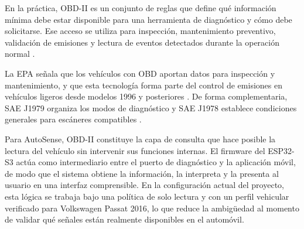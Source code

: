\documentclass[12pt,letterpaper]{report}
\begin{document}
En la práctica, OBD-II es un conjunto de reglas que define qué información mínima debe estar disponible para una herramienta de diagnóstico y cómo debe solicitarse. Ese acceso se utiliza para inspección, mantenimiento preventivo, validación de emisiones y lectura de eventos detectados durante la operación normal \cite{epa2016_vehicle_emissions_obd,sae2022_j1978_obdii_scan_tool}.

La EPA señala que los vehículos con OBD aportan datos para inspección y mantenimiento, y que esta tecnología forma parte del control de emisiones en vehículos ligeros desde modelos 1996 y posteriores \cite{epa2016_vehicle_emissions_obd}. De forma complementaria, SAE J1979 organiza los modos de diagnóstico y SAE J1978 establece condiciones generales para escáneres compatibles \cite{sae2025_j1979_diagnostic_test_modes,sae2022_j1978_obdii_scan_tool}.

Para AutoSense, OBD-II constituye la capa de consulta que hace posible la lectura del vehículo sin intervenir sus funciones internas. El firmware del ESP32-S3 actúa como intermediario entre el puerto de diagnóstico y la aplicación móvil, de modo que el sistema obtiene la información, la interpreta y la presenta al usuario en una interfaz comprensible. En la configuración actual del proyecto, esta lógica se trabaja bajo una política de solo lectura y con un perfil vehicular verificado para Volkswagen Passat 2016, lo que reduce la ambigüedad al momento de validar qué señales están realmente disponibles en el automóvil.
\end{document}

